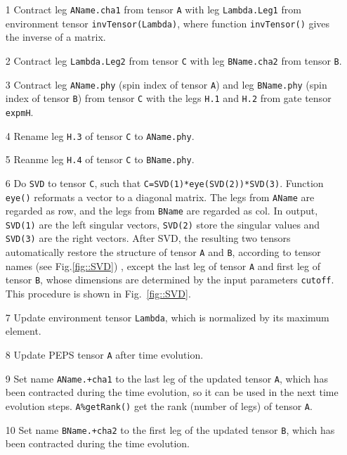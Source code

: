 \documentclass[preprint,3p,times,preprint,showpacs,amsmath,superscriptaddress,floatfix]{elsarticle}
\begin{document}
\begin{enumerate}
	\item[1] Contract leg {\tt AName.cha1} from tensor {\tt A} with leg {\tt Lambda.Leg1} from environment tensor {\tt invTensor(Lambda)}, where
function {\tt invTensor()} gives the inverse of a matrix.
	\item[2] Contract leg  {\tt Lambda.Leg2} from tensor {\tt C} with leg {\tt BName.cha2} from tensor {\tt B}.
	\item[3] Contract leg {\tt AName.phy} (spin index of tensor {\tt A}) and leg {\tt BName.phy} (spin index of tensor {\tt B}) from tensor {\tt C} with the legs {\tt H.1} and {\tt H.2} from gate tensor {\tt expmH}.
	\item[4] Rename leg {\tt H.3} of tensor {\tt C} to {\tt AName.phy}.
	\item[5] Reanme leg {\tt H.4} of tensor {\tt C} to {\tt BName.phy}.
	\item[6] Do {\tt SVD} to tensor {\tt C}, such that {\tt C=SVD(1)*eye(SVD(2))*SVD(3)}.
Function {\tt eye()}  reformats a vector to a diagonal matrix. The legs from {\tt AName} are regarded as row, and the legs from {\tt BName} are regarded as col. In output, {\tt SVD(1)} are the left singular vectors, {\tt SVD(2)} store the singular values and {\tt SVD(3)} are the right vectors.
After SVD, the resulting two tensors automatically restore the structure of tensor {\tt A} and {\tt B}, according to tensor names (see Fig.\ref{fig::SVD})
, except the last leg of tensor {\tt A} and first leg of tensor {\tt B}, whose dimensions are
determined by the input parameters {\tt cutoff}. This procedure is shown in Fig.~\ref{fig::SVD}.
    \item[7] Update environment tensor {\tt Lambda}, which is normalized by its maximum element.
    \item[8] Update PEPS tensor {\tt A} after time evolution.
    \item[9] Set name {\tt AName.+cha1} to the last leg of the updated tensor {\tt A}, which has been
    contracted during the time evolution, so it can be used in the next time evolution steps. {\tt A\%getRank()} get the rank (number of legs) of tensor {\tt A}.
    \item[10 ] Set name {\tt BName.+cha2} to the first leg of the updated tensor {\tt B}, which has been
    contracted during the time evolution.
\end{enumerate}
\end{document}
